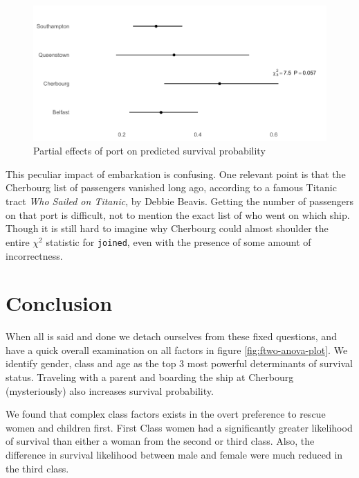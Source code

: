 \documentclass[]{interact}
\theoremstyle{plain}%
\theoremstyle{definition}
\theoremstyle{remark}
\begin{document}
\begin{figure}[H]

{\centering \includegraphics{titanic-survival_files/figure-latex/partial-port-1} 

}

\caption{Partial effects of port on predicted survival probability}\label{fig:partial-port}
\end{figure}

This peculiar impact of embarkation is confusing. One relevant point is that the Cherbourg list of passengers vanished long ago, according to a famous Titanic tract \emph{Who Sailed on Titanic}, by Debbie Beavis. Getting the number of passengers on that port is difficult, not to mention the exact list of who went on which ship. Though it is still hard to imagine why Cherbourg could almost shoulder the entire \(\chi^2\) statistic for \texttt{joined}, even with the presence of some amount of incorrectness.

\hypertarget{conclusion}{%
\section{Conclusion}\label{conclusion}}

When all is said and done we detach ourselves from these fixed questions, and have a quick overall examination on all factors in figure \ref{fig:ftwo-anova-plot}. We identify gender, class and age as the top 3 most powerful determinants of survival status. Traveling with a parent and boarding the ship at Cherbourg (mysteriously) also increases survival probability.

We found that complex class factors exists in the overt preference to rescue women and children first. First Class women had a significantly greater likelihood of survival than either a woman from the second or third class. Also, the difference in survival likelihood between male and female were much reduced in the third class.
\end{document}
